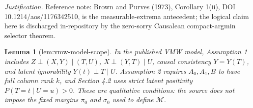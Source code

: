 \documentclass{article}
\newtheorem{lemma}{Lemma}
\begin{document}
\par\smallskip\noindent \textit{Justification.} Reference note: Brown and Purves (1973), Corollary 1(ii), DOI 10.1214/aos/1176342510, is the measurable-extrema antecedent; the logical claim here is discharged in-repository by the zero-sorry Causalean compact-argmin selector theorem.

\begin{lemma}[lem:vmw-model-scope]\label{lem:vmw-model-scope}
In the published VMW model, Assumption 1 includes \(Z\perp(X,Y)\mid(T,U)\), \(X\perp(Y,T)\mid U\), causal consistency \(Y=Y(T)\), and latent ignorability \(Y(t)\perp T\mid U\).  Assumption 2 requires \(A_0,A_1,B\) to have full column rank \(k\), and Section 4.2 uses strict latent positivity \(P(T=t\mid U=u)>0\).  These are qualitative conditions: the source does not impose the fixed margins \(\pi_0\) and \(\sigma_0\) used to define \(\mathcal M\).
\end{lemma}
\end{document}
